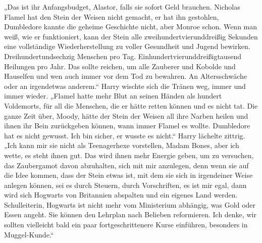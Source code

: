 „Das ist ihr Anfangsbudget, Alastor, falls sie sofort Geld brauchen. Nicholas Flamel hat den Stein der Weisen nicht gemacht, er hat ihn gestohlen, Dumbledore kannte die geheime Geschichte nicht, aber Monroe schon. Wenn man weiß, wie er funktioniert, kann der Stein alle zweihundertvierunddreißig Sekunden eine vollständige Wiederherstellung zu voller Gesundheit und Jugend bewirken. Dreihundertundsechzig Menschen pro Tag. Einhundertvierunddreißigtausend Heilungen pro Jahr. Das sollte reichen, um alle Zauberer und Kobolde und Hauselfen und wen auch immer vor dem Tod zu bewahren. An Altersschwäche oder an irgendetwas anderem.“
Harry wischte sich die Tränen weg, immer und immer wieder.
„Flamel hatte mehr Blut an seinen Händen als hundert Voldemorts, für all die Menschen, die er hätte retten können und es nicht tat. Die ganze Zeit über, Moody, hätte der Stein der Weisen all ihre Narben heilen und ihnen ihr Bein zurückgeben können, wann immer Flamel es wollte. Dumbledore hat es nicht gewusst. Ich bin sicher, er wusste es nicht.“
Harry lächelte zittrig.
„Ich kann mir sie nicht als Teenagerhexe vorstellen, Madam Bones, aber ich wette, es steht ihnen gut. Das wird ihnen mehr Energie geben, um zu versuchen, das Zaubergamot davon abzuhalten, sich mit mir anzulegen, denn wenn sie auf die Idee kommen, dass der Stein etwas ist, mit dem sie sich in irgendeiner Weise anlegen können, sei es durch Steuern, durch Vorschriften, es ist mir egal, dann wird sich Hogwarts von Britannien abspalten und ein eigenes Land werden. Schulleiterin, Hogwarts ist nicht mehr vom Ministerium abhängig, was Gold oder Essen angeht. Sie können den Lehrplan nach Belieben reformieren. Ich denke, wir sollten vielleicht bald ein paar fortgeschrittenere Kurse einführen, besonders in Muggel-Kunde.“


